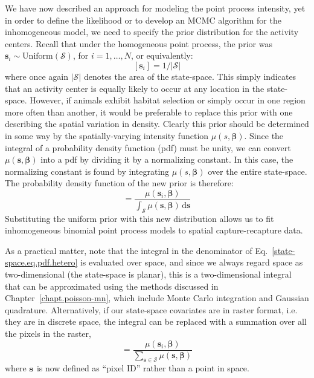 We have now described an approach for modeling the point process
intensity, yet in order to define the likelihood or to develop an MCMC
algorithm for the inhomogeneous model, we need to specify the prior
distribution for the activity centers. Recall that under the
homogeneous point process, the prior was
$\mathbf{s}_i \sim \text{Uniform}(\mathcal{S})$, for $i=1,\dots,N$, or
equivalently:
\begin{equation}
  \label{state-space.eq.uprior}
  [\mathbf{s}_i] = 1/|\mathcal{S}|
\end{equation}
where once again $|\mathcal{S}|$ denotes the area of the
state-space. This simply indicates that an activity center is equally
likely to occur at any location in the state-space.
However, if animals exhibit habitat selection or simply
occur in one region more often than another, it would be preferable to
replace this prior with one describing the spatial variation in
density. Clearly this prior should be determined in some way by the
spatially-varying intensity function $\mu(s, \bm{\beta})$.
Since
the integral of a probability density function (pdf) must be unity,
we can convert $\mu(\mathbf{s}, \bm{\beta})$ into a pdf by dividing it by a
normalizing constant. In this case, the normalizing constant is found by integrating
$\mu(s, \bm{\beta})$ over the entire state-space.
The probability density function of the new prior is therefore:
\begin{equation}
[\mathbf{s}_i | \bm{\beta}] = \frac{\mu(\mathbf{s}_i, \bm{\beta})}{\int_{\mathcal{S}} \mu(\mathbf{s}, \bm{\beta})\, \mathrm{d}\mathbf{s}}
\label{state-space.eq.pdf.hetero}
\end{equation}
Substituting the uniform prior with this new distribution
allows us to fit inhomogeneous binomial point process
models to spatial capture-recapture data.

As a practical matter, note that the integral in the
denominator of Eq.~\ref{state-space.eq.pdf.hetero} is evaluated over
space, and since we always regard space as two-dimensional (the
state-space is planar), this is a two-dimensional integral that can
be approximated using the methods discussed in
Chapter~\ref{chapt.poisson-mn}, which include
Monte Carlo integration and Gaussian quadrature. Alternatively, if
our state-space covariates are in raster format, i.e. they are
in discrete space, the integral can be replaced with a summation over
all the pixels in the raster,
\begin{equation}
[\mathbf{s}_i | \bm{\beta}] = \frac{\mu(\mathbf{s}_i, \bm{\beta})}{\sum_{\mathbf{s} \in \mathcal{S}} \mu(\mathbf{s}, \bm{\beta})}
\label{state-space.eq.pdf.hetero.d}
\end{equation}
where $\bf s$ is now defined as ``pixel ID'' rather than a point in space.

